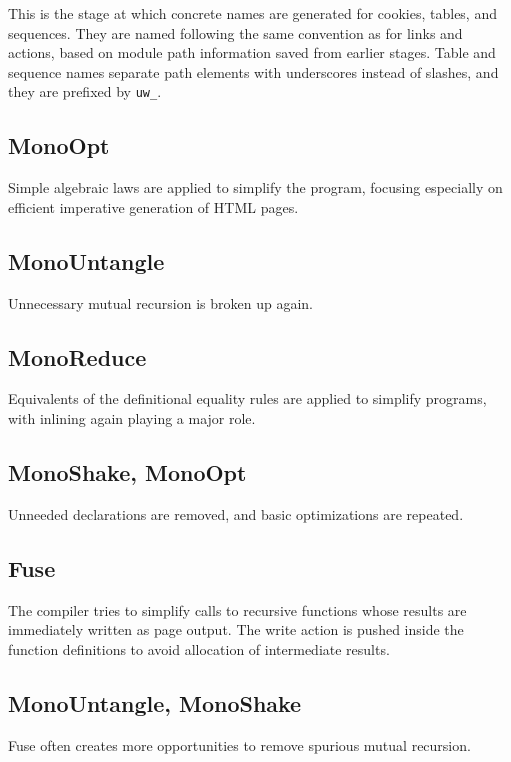 \documentclass{article}
\begin{document}
This is the stage at which concrete names are generated for cookies, tables, and sequences.  They are named following the same convention as for links and actions, based on module path information saved from earlier stages.  Table and sequence names separate path elements with underscores instead of slashes, and they are prefixed by \texttt{uw\_}.

\subsection{MonoOpt}

Simple algebraic laws are applied to simplify the program, focusing especially on efficient imperative generation of HTML pages.

\subsection{MonoUntangle}

Unnecessary mutual recursion is broken up again.

\subsection{MonoReduce}

Equivalents of the definitional equality rules are applied to simplify programs, with inlining again playing a major role.

\subsection{MonoShake, MonoOpt}

Unneeded declarations are removed, and basic optimizations are repeated.

\subsection{Fuse}

The compiler tries to simplify calls to recursive functions whose results are immediately written as page output.  The write action is pushed inside the function definitions to avoid allocation of intermediate results.

\subsection{MonoUntangle, MonoShake}

Fuse often creates more opportunities to remove spurious mutual recursion.
\end{document}
